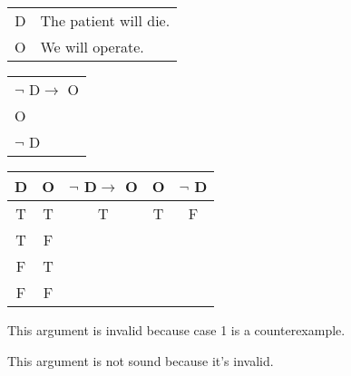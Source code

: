 \section{}
\centering
\begin{tabular}{r l}
    D & The patient will die. \\
    O & We will operate.
\end{tabular}
\begin{tabular}{l}
    $\lnot$ D$\rightarrow$ O\\
    O\\
    \hline
    $\lnot$ D
\end{tabular}

\begin{tabular}{c|c||c|c||c}
    D & O & $\lnot$ D$\rightarrow$ O & O & $\lnot$ D \\
    \hline
    T & T & T & T & F \\
    T & F &   &   &   \\
    F & T &   &   &   \\
    F & F &   &   &  
\end{tabular}

\justifying
\noindent This argument is invalid because case 1 is a counterexample.

\noindent This argument is not sound because it's invalid.